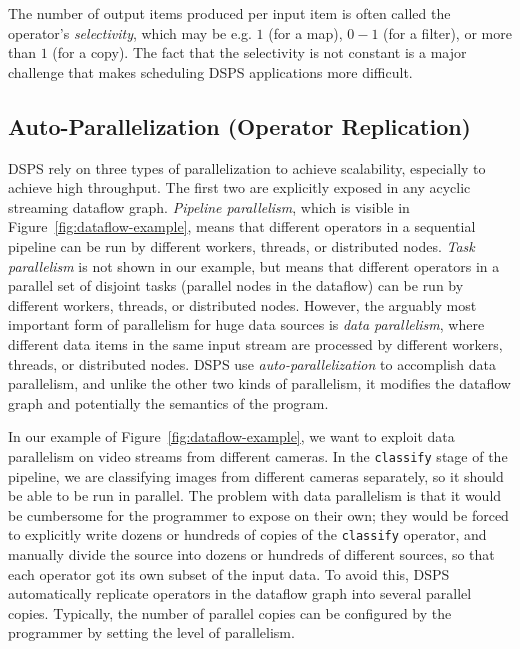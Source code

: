 The number of output items produced per input item is often called the operator's \emph{selectivity},
which may be e.g. $1$ (for a map), $0-1$ (for a filter), or more than $1$ (for a copy).
The fact that the selectivity is not constant is a major challenge that makes scheduling DSPS applications more difficult.

\subsection{Auto-Parallelization (Operator Replication)}
\label{bg:autoparallelization}

DSPS rely on three types of parallelization to achieve scalability, especially to achieve high throughput.
The first two are explicitly exposed in any acyclic streaming dataflow graph. \emph{Pipeline parallelism}, which is visible in Figure~\ref{fig:dataflow-example}, means that different operators in a sequential pipeline can be run by different workers, threads, or distributed nodes. \emph{Task parallelism} is not shown in our example, but means that different operators in a parallel set of disjoint tasks (parallel nodes in the dataflow) can be run by different workers, threads, or distributed nodes. However, the arguably most important form of parallelism for huge data sources is \emph{data parallelism}, where different data items in the same input stream are processed by different workers, threads, or distributed nodes.
DSPS use \emph{auto-parallelization} to accomplish data parallelism, and unlike the other two kinds of parallelism, it modifies the dataflow graph and potentially the semantics of the program.

In our example of Figure~\ref{fig:dataflow-example}, we want to exploit data parallelism on video streams from different cameras. In the \texttt{classify} stage of the pipeline, we are classifying images from different cameras separately, so it should be able to be run in parallel.
The problem with data parallelism is that it would be cumbersome for the programmer to expose on their own; they would be forced to explicitly write dozens or hundreds of copies of the \texttt{classify} operator, and manually divide the source into dozens or hundreds of different sources, so that each operator got its own subset of the input data.
To avoid this, DSPS automatically replicate operators in the dataflow graph into several parallel copies. Typically, the number of parallel copies can be configured by the programmer by setting the level of parallelism.

